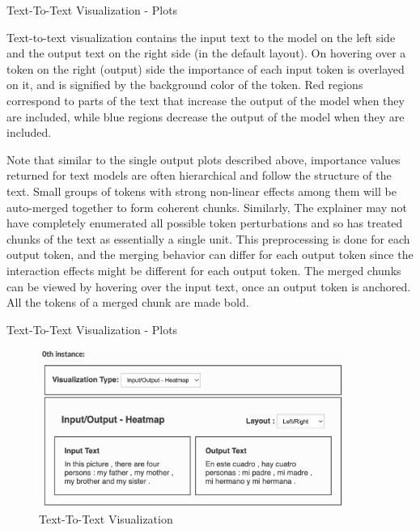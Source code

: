\documentclass[aspectratio=169]{beamer}
\begin{document}
\begin{frame}{Text-To-Text Visualization - Plots}

Text-to-text visualization contains the input text to the model on the left side and the output text on the right side (in the default layout). On hovering over a token on the right (output) side the importance of each input token is overlayed on it, and is signified by the background color of the token. Red regions correspond to parts of the text that increase the output of the model when they are included, while blue regions decrease the output of the model when they are included.

Note that similar to the single output plots described above, importance values returned for text models are often hierarchical and follow the structure of the text. Small groups of tokens with strong non-linear effects among them will be auto-merged together to form coherent chunks. Similarly, The explainer may not have completely enumerated all possible token perturbations and so has treated chunks of the text as essentially a single unit. This preprocessing is done for each output token, and the merging behavior can differ for each output token since the interaction effects might be different for each output token. The merged chunks can be viewed by hovering over the input text, once an output token is anchored. All the tokens of a merged chunk are made bold.
\end{frame}

\begin{frame}{Text-To-Text Visualization - Plots}
    \begin{figure}[htbp]
        \centering
        \includegraphics[width=0.9\textwidth]{figs/shap/plots/text/text-to-text.png}
        \caption{Text-To-Text Visualization}
        \label{fig:text-to-text-view}
    \end{figure}
\end{frame}
\end{document}
